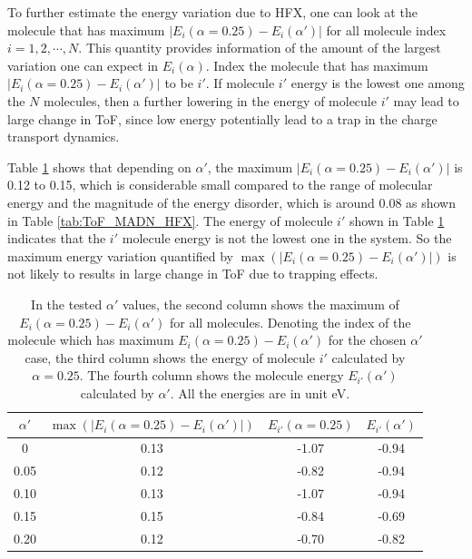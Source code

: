 \documentclass[%
 reprint,
 amsmath,amssymb,
 aps,
]{revtex4-2}
\begin{document}
To further estimate the energy variation due to HFX, one can look at the molecule that has maximum $|E_i(\alpha=0.25) - E_i(\alpha')|$ for all molecule index $i=1,2,\cdots,N$. 
This quantity provides information of the amount of the largest variation one can expect in $E_i(\alpha)$. Index the molecule that has maximum $|E_i(\alpha=0.25) - E_i(\alpha')|$ to be $i'$. 
If molecule $i'$ energy is the lowest one among the $N$ molecules, then a further lowering in the energy of molecule $i'$ may lead to large change in ToF, since low energy potentially lead to a trap in the charge transport dynamics. 

Table \ref{tab:maxEi} shows that depending on $\alpha'$, the maximum $|E_i(\alpha=0.25) - E_i(\alpha')|$ is 0.12 to 0.15, which is considerable small compared to the range of molecular energy and the magnitude of the energy disorder, which is around 0.08 as shown in Table \ref{tab:ToF_MADN_HFX}. 
The energy of molecule $i'$ shown in Table \ref{tab:maxEi} indicates that the $i'$ molecule energy is not the lowest one in the system. So the maximum energy variation quantified by $\max(|E_i(\alpha=0.25) - E_i(\alpha')|)$ is not likely to results in large change in ToF due to trapping effects. 
%
\begin{table}[tbp]%
\caption{\label{tab:maxEi}%
In the tested $\alpha'$ values, the second column shows the maximum of $E_i(\alpha=0.25) - E_i(\alpha')$ for all molecules. Denoting the index of the molecule which has maximum $E_i(\alpha=0.25) - E_i(\alpha')$ for the chosen $\alpha'$ case, the third column shows the energy of molecule $i'$ calculated by $\alpha=0.25$. The fourth column shows the molecule energy $E_{i'}(\alpha')$ calculated by $\alpha'$. All the energies are in unit \unit[]{eV}.
}
\begin{ruledtabular}
  \begin{tabular}{c c c c}
  $\alpha'$ & $\max(|E_i(\alpha=0.25) - E_i(\alpha')|)$  & $E_{i'}(\alpha=0.25)$ & $E_{i'}(\alpha')$ \\
    \hline
  0 & 0.13 &  -1.07 & -0.94 \\
  0.05 & 0.12 & -0.82 & -0.94 \\
  0.10 & 0.13 & -1.07 & -0.94 \\
  0.15 & 0.15 & -0.84 & -0.69 \\
  0.20 & 0.12 & -0.70 & -0.82 \\
    \end{tabular}
\end{ruledtabular}
\end{table}
\end{document}
